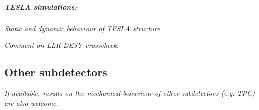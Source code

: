 \subparagraph{\textbf{TESLA simulations:}} \textit{Static and dynamic behaviour of TESLA structure}

\textit{Comment on LLR-DESY crosscheck.}

\subsection{Other subdetectors}

\textit{If available, results on the mechanical behaviour of other subdetectors (e.g. TPC) are also welcome.}

\vspace{2cm}
